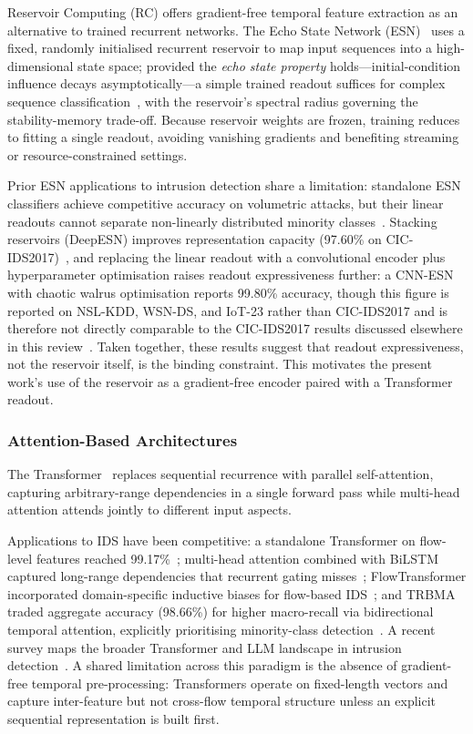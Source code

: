 \documentclass[5p,times]{elsarticle}
\begin{document}
	Reservoir Computing (RC) offers gradient-free temporal feature extraction
	as an alternative to trained recurrent networks. The Echo State Network
	(ESN)~\cite{jaeger2001} uses a fixed, randomly initialised recurrent
	reservoir to map input sequences into a high-dimensional state space;
	provided the \emph{echo state property} holds---initial-condition
	influence decays asymptotically---a simple trained readout suffices for
	complex sequence classification~\cite{lukosevicius2012}, with the
	reservoir's spectral radius governing the stability-memory trade-off.
	Because reservoir weights are frozen, training reduces to fitting a
	single readout, avoiding vanishing gradients and benefiting streaming or
	resource-constrained settings.
	
	Prior ESN applications to intrusion detection share a limitation:
	standalone ESN classifiers achieve competitive accuracy on volumetric
	attacks, but their linear readouts cannot separate non-linearly
	distributed minority classes~\cite{esn_dos2021,mlesn2020}. Stacking
	reservoirs (DeepESN) improves representation capacity (97.60\% on
	CIC-IDS2017)~\cite{gallicchio2017}, and replacing the linear readout
	with a convolutional encoder plus hyperparameter optimisation raises
	readout expressiveness further: a CNN-ESN with chaotic walrus
	optimisation reports 99.80\% accuracy, though this figure is reported
	on NSL-KDD, WSN-DS, and IoT-23 rather than CIC-IDS2017 and is therefore
	not directly comparable to the CIC-IDS2017 results discussed
	elsewhere in this review~\cite{cesn2024}. Taken together, these results
	suggest that readout expressiveness, not the reservoir itself, is the
	binding constraint. This motivates the present work's use of the
	reservoir as a gradient-free encoder paired with a Transformer readout.
	
	\subsubsection{Attention-Based Architectures}
	\label{subsec:attention}
	
	The Transformer~\cite{vaswani2017attention} replaces sequential
	recurrence with parallel self-attention, capturing arbitrary-range
	dependencies in a single forward pass while multi-head attention attends
	jointly to different input aspects.
	
	Applications to IDS have been competitive: a standalone Transformer on
	flow-level features reached 99.17\%~\cite{rtids2022}; multi-head
	attention combined with BiLSTM captured long-range dependencies that
	recurrent gating misses~\cite{bilstm_attn2023}; FlowTransformer
	incorporated domain-specific inductive biases for flow-based
	IDS~\cite{flowformer2024}; and TRBMA traded aggregate accuracy (98.66\%)
	for higher macro-recall via bidirectional temporal attention, explicitly
	prioritising minority-class detection~\cite{trbma2025}. A recent survey
	maps the broader Transformer and LLM landscape in intrusion
	detection~\cite{kheddar2024transformers}. A shared limitation across
	this paradigm is the absence of gradient-free temporal pre-processing:
	Transformers operate on fixed-length vectors and capture inter-feature
	but not cross-flow temporal structure unless an explicit sequential
	representation is built first.
	
\end{document}
